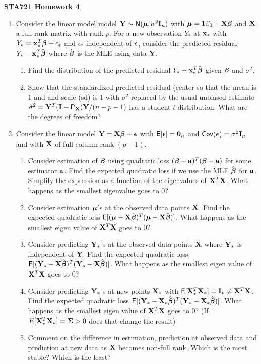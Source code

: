 \documentclass{article}
\begin{document}
{\bf STA721 \hfill Homework 4}

\vspace{.5in}
\begin{enumerate}
\item Consider the linear model  model $\mathbf{Y} \sim \textsf{N}(\boldsymbol{\mu}, \sigma^2 \mathbf{I}_n)$
  with  $\boldsymbol{\mu} = \mathbf{1} \beta_0 + \mathbf{X} \boldsymbol{\beta}$ and $\mathbf{X}$ a full rank matrix with
  rank $p$.  For a new observation $Y_*$ at $\mathbf{x}_*$ with $Y_* =
  \mathbf{x}_*^T\boldsymbol{\beta} + \epsilon_*$ and $\epsilon_*$ independent of $\boldsymbol{\epsilon}$,  consider the
  predicted residual  $Y_* - \mathbf{x}^T_* \hat{\boldsymbol{\beta}}$ where $\hat{\boldsymbol{\beta}}$ is the MLE
  using data $\mathbf{Y}$.   
  \begin{enumerate}
  \item Find the distribution of the predicted residual $Y_* - \mathbf{x}^T_*
    \hat{\boldsymbol{\beta}}$ given $\boldsymbol{\beta}$ and  $\sigma^2$. 
\item Show that the standardized predicted residual (center so that
  the mean is 1 and and scale (sd) is 
  1 with $\sigma^2$ replaced by the usual unbiased estimate
  $\hat{\sigma}^2 = \mathbf{Y}^T(\mathbf{I}-\textsf{P}_{\mathbf{X}})\mathbf{Y}/ (n - p - 1)$ has a student $t$
  distribution.  What are the degrees of freedom?   
  \end{enumerate}
  \item   Consider the linear model $\mathbf{Y} = \mathbf{X}\boldsymbol{\beta} + \boldsymbol{\epsilon}$ with $\textsf{E}[\boldsymbol{\epsilon}]
    = \mathbf{0}_n$ and $\textsf{Cov}(\boldsymbol{\epsilon}) = \sigma^2 \mathbf{I}_n$ and with $\mathbf{X}$ of full
    column rank $(p+1)$.
  \begin{enumerate}
\item Consider estimation of $\boldsymbol{\beta}$ using quadratic loss $(\boldsymbol{\beta} -
  \mathbf{a})^T(\boldsymbol{\beta} - \mathbf{a})$ for some estimator $\mathbf{a}$.  Find the expected quadratic
  loss if we use the MLE $\hat{\boldsymbol{\beta}}$ for $\mathbf{a}$. Simplify the expression
  as a function of the eigenvalues of $\mathbf{X}^T\mathbf{X}$.   What happens as the
  smallest eigenvalue goes to 0?
\item Consider estimation $\boldsymbol{\mu}$'s at the observed data points
  $\mathbf{X}$.  Find the expected  quadratic loss   $\textsf{E}[(\boldsymbol{\mu} -
  \mathbf{X}\hat{\boldsymbol{\beta}})^T(\boldsymbol{\mu} - \mathbf{X}\hat{\boldsymbol{\beta}})]$.  What happens as the  smallest eigen
  value of $\mathbf{X}^T\mathbf{X}$ goes to 0?
\item Consider predicting $\mathbf{Y}_*$'s at the observed data points $\mathbf{X}$
  where $\mathbf{Y}_*$ is independent of $\mathbf{Y}$.  Find the expected quadratic
  loss $\textsf{E}[(\mathbf{Y}_* - \mathbf{X}\hat{\boldsymbol{\beta}})^T(\mathbf{Y}_* - \mathbf{X}\hat{\boldsymbol{\beta}})]$.  What happens as the
  smallest eigen value of $\mathbf{X}^T\mathbf{X}$ goes to 0?
\item Consider predicting $\mathbf{Y}_*$'s at new points $\mathbf{X}_*$ with
  $\textsf{E}[\mathbf{X}_*^T\mathbf{X}_*] = \mathbf{I}_p \neq \mathbf{X}^T\mathbf{X}$.  Find the expected quadratic loss
  $\textsf{E}[(\mathbf{Y}_* - \mathbf{X}_*\hat{\boldsymbol{\beta}})^T(\mathbf{Y}_* - \mathbf{X}_*\hat{\boldsymbol{\beta}})]$.  What
  happens as the smallest eigen value of $\mathbf{X}^T\mathbf{X}$ goes to 0?  (If
  $E[\mathbf{X}_*^T\mathbf{X}_*] = \boldsymbol{\Sigma} > 0$ does that change the result)
\item Comment on the difference in estimation, prediction at observed
  data and prediction at new data as $\mathbf{X}$ becomes non-full rank.
  Which is the most stable?  Which is the least?
  \end{enumerate}
\end{enumerate}
\end{document}
